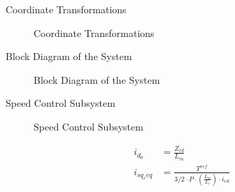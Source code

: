 \begin{frame}{Coordinate Transformations}
	\begin{figure}
		\centering
		\caption{Coordinate Transformations}
	\end{figure}
\end{frame}


\begin{frame}{Block Diagram of the System}
	\begin{figure}
		\centering

		\caption{Block Diagram of the System}
	\end{figure}
\end{frame}

\begin{frame}{Speed Control Subsystem}
	\vspace{-0.5cm} %
	\begin{figure}
		\centering
		\caption{Speed Control Subsystem}
	\end{figure}
	\vspace{-0.5cm} %
	\begin{align}
		i_{d_0}    & = \frac{Z_{rd}}{L_m}                                                          \\
		i_{sq_req} & = \frac{T^{ref}}{3/2 \cdot P \cdot \left(\frac{L_m}{L_r}\right) \cdot i_{rd}}
	\end{align}
\end{frame}


